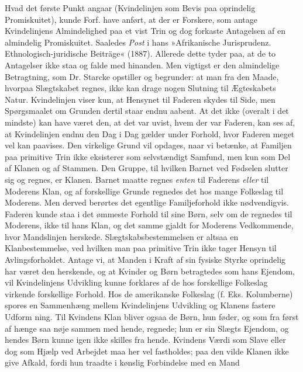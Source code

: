 \documentclass[12pt,a4paper,openany]{book}
\newcommand{\opage}[1]{\marginnote{\footnotesize\textit{[#1]}}}
\begin{document}
Hvad det første Punkt angaar (Kvindelinjen som Bevis paa
oprindelig Promiskuitet), kunde Forf. have anført, at der er
Forskere, som antage Kvindelinjens Almindelighed paa et vist
Trin og dog forkaste Antagelsen af en almindelig Promiskuitet.
Saaledes \emph{Post} i hans »Afrikanische Jurisprudenz. Ethnologisch-juridische
Beiträge« (1887). Allerede dette tyder paa, at de to
Antagelser ikke staa og falde med hinanden. Men vigtigst er den
almindelige Betragtning, som Dr. Starcke opstiller og begrunder:
at man fra den Maade, hvorpaa Slægtskabet regnes, ikke kan
drage nogen Slutning til Ægteskabets Natur. Kvindelinjen viser
kun, at Hensynet til Faderen skydes til Side, men Spørgsmaalet
om Grunden dertil staar endnu aabent. At det ikke (overalt i
det mindste) kan have været den, at det var uvist, hvem der var
Faderen, kan ses af, at Kvindelinjen endnu den Dag i Dag gælder
under Forhold, hvor Faderen meget vel kan paavises. Den virkelige
Grund vil opdages, naar vi betænke, at Familjen paa primitive
Trin ikke eksisterer som selvstændigt Samfund, men kun som Del
af Klanen og af Stammen. Den Gruppe, til hvilken Barnet ved
Fødselen slutter sig og regnes, er Klanen. Barnet maatte regnes
\emph{enten} til Faderens \emph{eller} til Moderens Klan, og af forskellige
Grunde regnedes det hos mange Folkeslag til Moderens. Men
derved berørtes det egentlige Familjeforhold ikke nødvendigvis.
Faderen kunde staa i det ømmeste Forhold til sine Børn, selv om
de regnedes til Moderens, ikke til hans Klan, og det samme
gjaldt for Moderens Vedkommende, hvor Mandslinjen herskede.
Slægtskabsbestemmelsen er altsaa en Klanbestemmelse, ved hvilken
man paa primitive Trin ikke tager Hensyn til Avlingsforholdet.
Antage vi, at Manden i Kraft af sin fysiske Styrke oprindelig har
været den herskende, og at Kvinder og Børn betragtedes som
hans Ejendom, vil Kvindelinjens Udvikling kunne forklares af de
hos forskellige Folkeslag virkende forskellige Forhold. Hos de
amerikanske Folkeslag (f. Eks. Kolumberne) spores en Sammenhæng
mellem Kvindelinjens Udvikling og Klanens fastere Udform%
\opage{791}ning. Til Kvindens Klan bliver ogsaa de Børn, hun føder, og
som fra først af hænge saa nøje sammen med hende, regnede;
hun er sin Slægts Ejendom, og hendes Børn kunne igen ikke
skilles fra hende. Kvindens Værdi som Slave eller dog som Hjælp
ved Arbejdet maa her vel fastholdes; paa den vilde Klanen ikke
give Afkald, fordi hun traadte i kønslig Forbindelse med en Mand
\end{document}
